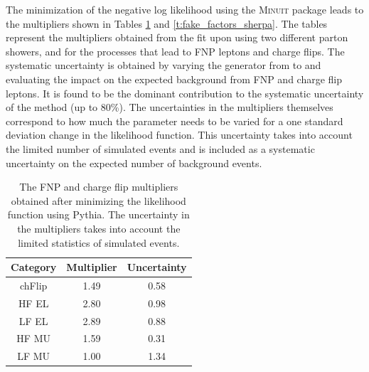 The minimization of the negative log likelihood using the \textsc{Minuit} package leads 
to the multipliers shown in Tables \ref{t:fake_factors_powheg} and \ref{t:fake_factors_sherpa}.
The tables represent the multipliers obtained from the fit upon using two different parton showers, \POWHEGBOX and \SHERPA 
for the processes that lead to FNP leptons and charge flips.
The systematic uncertainty is obtained by varying the 
generator from \POWHEGBOX to \SHERPA and evaluating the impact on the expected background from FNP and charge flip leptons. 
It is found to be the dominant contribution to the systematic uncertainty of the method (up to 80\%).
The uncertainties in the multipliers themselves correspond to how much the parameter needs to be varied for 
a one standard deviation change in the likelihood function. This uncertainty takes into account the limited number of simulated events and is included as a 
systematic uncertainty on the expected number of background events. 

\begin{table}[htb]
  \caption{The FNP and charge flip multipliers obtained after minimizing the likelihood function using Pythia.
    The uncertainty in the multipliers takes into account the limited statistics of simulated events.
    \label{t:fake_factors_powheg}}
  \centering
   \begin{tabular}{|c|c|c|}
          \hline
          Category & Multiplier & Uncertainty  \\
          \hline
          chFlip & 1.49 & 0.58 \\ 
          HF EL & 2.80 & 0.98 \\
          LF EL & 2.89 & 0.88 \\
          HF MU & 1.59 & 0.31 \\
          LF MU & 1.00 & 1.34 \\
          \hline
        \end{tabular}
\end{table}

